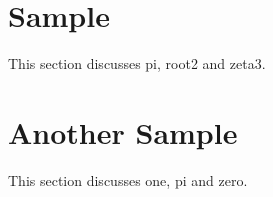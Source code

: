 \documentclass[12pt]{article}
\begin{document}
\section{Sample}
This section discusses \gls{pi}, \gls{root2} and \gls{zeta3}. 

\section{Another Sample}
This section discusses \gls{one}, \gls{pi} and \gls{zero}. 

\printunsrtglossaries 
\end{document}
